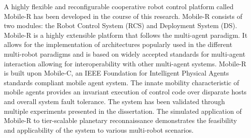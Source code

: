 \documentclass[12pt,twoside,letterpaper]{article}
\begin{document}
\doublespacing
A highly flexible and reconfigurable cooperative robot control platform called
  Mobile-R has been developed in the course of this research.
Mobile-R consists of two modules: the Robot Control System (RCS) and 
  Deployment System (DS).
Mobile-R is a highly extensible platform that follows the multi-agent 
  paradigm.
It allows for the implementation of architectures popularly used in the 
  different multi-robot paradigms and is based on widely accepted standards
  for multi-agent interaction allowing for interoperability with other 
  multi-agent systems. 
Mobile-R is built upon Mobile-C, an IEEE  Foundation for Intelligent 
  Physical Agents standards compliant mobile agent system. 
The innate mobility characteristic of mobile agents provides an invariant 
  execution of control code over disparate hosts and overall system fault 
  tolerance.
The system has been validated through multiple experiments presented in the
  dissertation.
The simulated application of Mobile-R to tier-scalable planetary reconnaissance 
  demonstrates the feasibility and applicability of the system to various 
  multi-robot scenarios.
\end{document}
